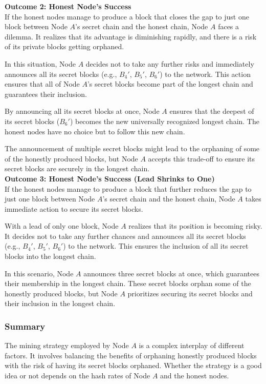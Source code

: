 \noindent
\textbf{Outcome 2: Honest Node's Success}\\
If the honest nodes manage to produce a block that closes the gap to just one block between Node $A$'s secret chain and the honest chain, Node $A$ faces a dilemma. It realizes that its advantage is diminishing rapidly, and there is a risk of its private blocks getting orphaned.

In this situation, Node $A$ decides not to take any further risks and immediately announces all its secret blocks (e.g., $B_{4}'$, $B_{5}'$, $B_{6}'$) to the network. This action ensures that all of Node $A$'s secret blocks become part of the longest chain and guarantees their inclusion.

By announcing all its secret blocks at once, Node $A$ ensures that the deepest of its secret blocks ($B_{6}'$) becomes the new universally recognized longest chain. The honest nodes have no choice but to follow this new chain.

The announcement of multiple secret blocks might lead to the orphaning of some of the honestly produced blocks, but Node $A$ accepts this trade-off to ensure its secret blocks are securely in the longest chain.\\

\noindent
\textbf{Outcome 3: Honest Node's Success (Lead Shrinks to One)}\\
If the honest nodes manage to produce a block that further reduces the gap to just one block between Node $A$'s secret chain and the honest chain, Node $A$ takes immediate action to secure its secret blocks.

With a lead of only one block, Node $A$ realizes that its position is becoming risky. It decides not to take any further chances and announces all its secret blocks (e.g., $B_{4}'$, $B_{5}'$, $B_{6}'$) to the network. This ensures the inclusion of all its secret blocks into the longest chain.

In this scenario, Node $A$ announces three secret blocks at once, which guarantees their membership in the longest chain. These secret blocks orphan some of the honestly produced blocks, but Node $A$ prioritizes securing its secret blocks and their inclusion in the longest chain.

\subsubsection{Summary}
The mining strategy employed by Node $A$ is a complex interplay of different factors. It involves balancing the benefits of orphaning honestly produced blocks with the risk of having its secret blocks orphaned. Whether the strategy is a good idea or not depends on the hash rates of Node $A$ and the honest nodes.\\

